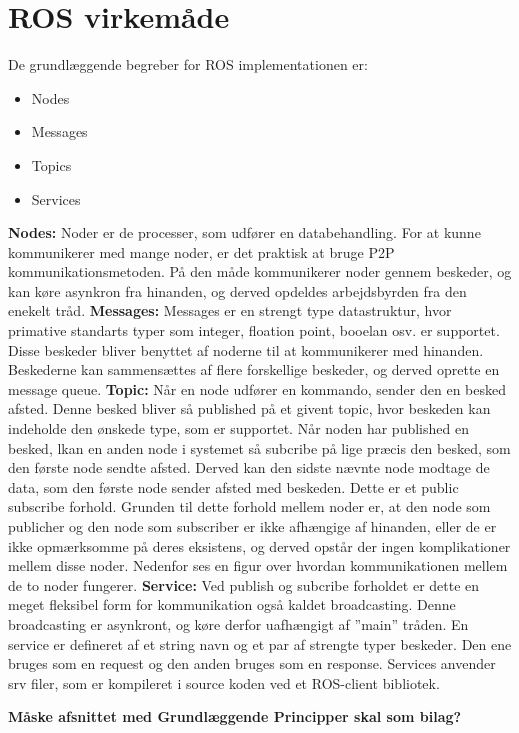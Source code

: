 \section{ROS virkemåde}
De grundlæggende begreber for ROS implementationen er:
\begin{itemize}  
\item Nodes
\item Messages
\item Topics
\item Services
\end{itemize}
\textbf{Nodes:} Noder er de processer, som udfører en databehandling. For at kunne kommunikerer med mange noder, er det praktisk at bruge P2P kommunikationsmetoden. På den måde kommunikerer noder gennem beskeder, og kan køre asynkron fra hinanden, og derved opdeldes arbejdsbyrden fra den enekelt tråd.\newline
\newline
\textbf{Messages:} Messages er en strengt type datastruktur, hvor primative standarts typer som integer, floation point, booelan osv. er supportet. Disse beskeder bliver benyttet af noderne til at kommunikerer med hinanden. Beskederne kan sammensættes af flere forskellige beskeder, og derved oprette en message queue.\newline
\newline
\textbf{Topic:} Når en node udfører en kommando, sender den en besked afsted. Denne besked bliver så published på et givent topic, hvor beskeden kan indeholde den ønskede type, som er supportet. Når noden har published en besked, lkan en anden node i systemet så subcribe på lige præcis den besked, som den første node sendte afsted. Derved kan den sidste nævnte node modtage de data, som den første node sender afsted med beskeden. Dette er et public subscribe forhold. Grunden til dette forhold mellem noder er, at den node som publicher og den node som subscriber er ikke afhængige af hinanden, eller de er ikke opmærksomme på deres eksistens, og derved opstår der ingen komplikationer mellem disse noder.\newline
Nedenfor ses en figur over hvordan kommunikationen mellem de to noder fungerer.
\textbf{Service:} Ved publish og subcribe forholdet er dette en meget fleksibel form for kommunikation også kaldet broadcasting. Denne broadcasting er asynkront, og køre derfor uafhængigt af ''main'' tråden. En service er defineret af et string navn og et par af strengte typer beskeder. Den ene bruges som en request og den anden bruges som en response. Services anvender srv filer, som er kompileret i source koden ved et ROS-client bibliotek.

\textbf{Måske afsnittet med Grundlæggende Principper skal som bilag?}
